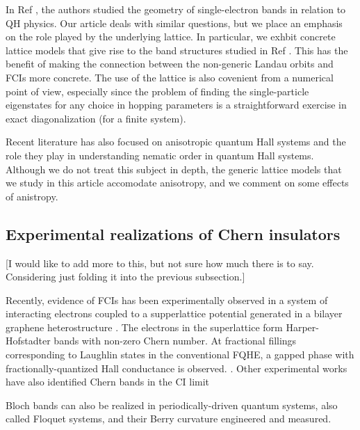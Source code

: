 \documentclass[aps,prb,twocolumn,letterpaper,twoside,nobalancelastpage,groupedaddress,amsmath,amssymb,floatfix,citeautoscript]{revtex4-1}
\begin{document}
In Ref , the authors studied the geometry of single-electron bands in relation to QH physics. Our article deals with similar questions, but we place an emphasis on the role played by the underlying lattice. In particular, we exhbit concrete lattice models that give rise to the band structures studied in Ref . This has the benefit of making the connection between the non-generic Landau orbits and FCIs more concrete. The use of the lattice is also covenient from a numerical point of view, especially since the problem of finding the single-particle eigenstates for any choice in hopping parameters is a straightforward exercise in exact diagonalization (for a finite system).

Recent literature has also focused on anisotropic quantum Hall systems\cite{Qiu2012,Yang2012,Regnault2017rmks,Yang2017} and the role they play in understanding nematic order in quantum Hall systems\cite{Maciejko2013,You2014}. Although we do not treat this subject in depth, the generic lattice models that we study in this article accomodate anisotropy, and we comment on some effects of anistropy.

\subsection{Experimental realizations of Chern insulators}
[I would like to add more to this, but not sure how much there is to say. Considering just folding it into the previous subsection.]

Recently, evidence of FCIs has been experimentally observed in a system of interacting electrons coupled to a supperlattice potential generated in a bilayer graphene heterostructure \cite{Spantoneaan8458}. The electrons in the superlattice form Harper-Hofstadter bands with non-zero Chern number. At fractional fillings corresponding to Laughlin states in the conventional FQHE, a gapped phase with fractionally-quantized Hall conductance is observed. \cite{Spantoneaan8458}. 
Other experimental works have also identified Chern bands in the CI limit \cite{Jotzu2014,Aidelsburger:2014hm,Aidelsburger:2013ew}

Bloch bands can also be realized in periodically-driven quantum systems, also called Floquet systems, and their Berry curvature engineered and measured.\cite{Flaschner1091}
\end{document}
